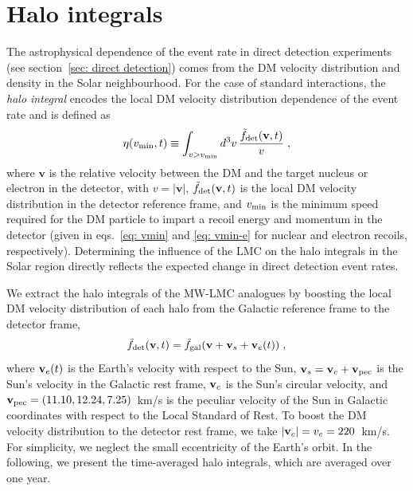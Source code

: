 \section{Halo integrals}
\label{sec: halo integrals}

The astrophysical dependence of the event rate in direct detection experiments (see section~\ref{sec: direct detection}) comes from the DM velocity distribution and density in the Solar neighbourhood. For the case of standard interactions, the \emph{halo integral} encodes the local DM velocity distribution dependence of the event rate  and is defined as
\begin{equation}
    \eta (v_{\rm min}, t) \equiv \int_{v>v_{\rm min}} d^{3}v\, \frac{\tilde{f}_{\rm det}(\mathbf{v},t)}{v} \; ,
    \label{eq: halo integral}
\end{equation}
%
where $\mathbf{v}$ is the relative velocity between the DM and the target nucleus or electron in the detector, with $v=|\mathbf{v}|$, $\tilde{f}_{\rm det}({\bf v},t)$ is the local DM velocity  distribution in the detector reference frame, and  $v_{\rm min}$ is the minimum  speed required for the DM particle to impart a recoil energy and momentum in the detector (given in eqs.~\eqref{eq: vmin} and \eqref{eq: vmin-e} for nuclear and electron recoils, respectively). Determining the influence of the LMC on the halo integrals in the Solar region directly reflects the expected change in direct detection event rates.

 

We extract the halo integrals of the MW-LMC analogues by boosting the local DM velocity distribution of each halo from the Galactic reference frame to the detector frame,
\begin{equation}
\tilde{f}_{\rm det}({\bf v},t) = \tilde{f}_{\rm gal}({\bf v}+{\bf v}_s+{\bf v}_e(t))\; , 
\end{equation}
where ${\bf v}_e(t)$ is the Earth's velocity with respect to the Sun, ${\bf v}_s={\bf v}_c +{\bf v}_{\rm pec}$ is the Sun's velocity in the Galactic rest frame, ${\bf v}_c$ is the Sun's circular velocity, and ${\bf v}_{\rm pec}=(11.10, 12.24, 7.25)$~km/s \cite{Schoenrich:2009bx} is the peculiar velocity of the Sun in Galactic coordinates with respect to the Local Standard of Rest. To boost the DM velocity distribution to the detector rest frame, we take $|{\bf v}_c|=v_c=220$~km/s. For simplicity, we neglect the small eccentricity of the Earth's orbit. In the following, we present the time-averaged halo integrals, which are averaged over one year.



